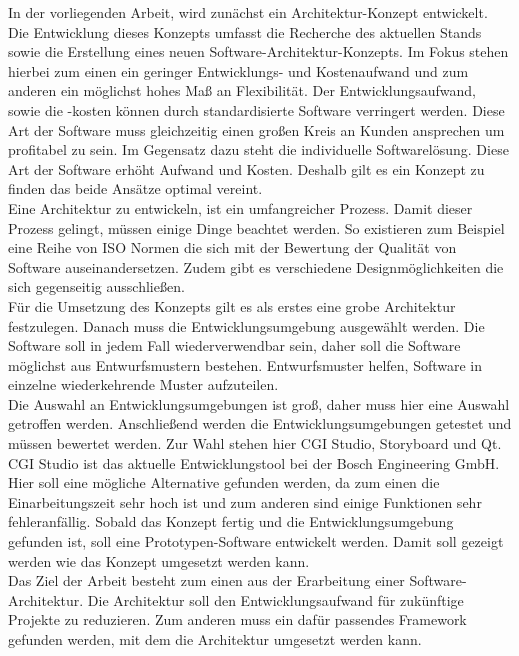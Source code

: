 In der vorliegenden Arbeit, wird zunächst ein Architektur-Konzept entwickelt. Die Entwicklung dieses Konzepts umfasst die Recherche des aktuellen Stands sowie die Erstellung eines neuen Software-Architektur-Konzepts. Im Fokus stehen hierbei zum einen ein geringer Entwicklungs- und Kostenaufwand und zum anderen ein möglichst hohes Maß an Flexibilität. Der Entwicklungsaufwand, sowie die -kosten können durch standardisierte Software verringert werden. Diese Art der Software muss gleichzeitig einen großen Kreis an Kunden ansprechen um profitabel zu sein. Im Gegensatz dazu steht die individuelle Softwarelösung. Diese Art der Software erhöht Aufwand und Kosten. Deshalb gilt es ein Konzept zu finden das beide Ansätze optimal vereint.\\

Eine Architektur zu entwickeln, ist ein umfangreicher Prozess. Damit dieser Prozess gelingt, müssen einige Dinge beachtet werden. So existieren zum Beispiel eine Reihe von ISO Normen die sich mit der Bewertung der Qualität von Software auseinandersetzen. Zudem gibt es verschiedene Designmöglichkeiten die sich gegenseitig ausschließen.\\

Für die Umsetzung des Konzepts gilt es als erstes eine grobe Architektur festzulegen. Danach muss die Entwicklungsumgebung ausgewählt werden. Die Software soll in jedem Fall wiederverwendbar sein, daher soll die Software möglichst aus Entwurfsmustern bestehen. Entwurfsmuster helfen, Software in einzelne wiederkehrende Muster aufzuteilen.\\

Die Auswahl an Entwicklungsumgebungen ist groß, daher muss hier eine Auswahl getroffen werden. Anschließend werden die Entwicklungsumgebungen getestet und müssen bewertet werden. Zur Wahl stehen hier CGI Studio, Storyboard und Qt. CGI Studio ist das aktuelle Entwicklungstool bei der Bosch Engineering GmbH. Hier soll eine mögliche Alternative gefunden werden, da zum einen die Einarbeitungszeit sehr hoch ist und zum anderen sind einige Funktionen sehr fehleranfällig. Sobald das Konzept fertig und die Entwicklungsumgebung gefunden ist, soll eine Prototypen-Software entwickelt werden. Damit soll gezeigt werden wie das Konzept umgesetzt werden kann.\\

Das Ziel der Arbeit besteht zum einen aus der Erarbeitung einer Software-Architektur. Die Architektur soll den Entwicklungsaufwand für zukünftige Projekte zu reduzieren. Zum anderen muss ein dafür passendes Framework gefunden werden, mit dem die Architektur umgesetzt werden kann.\\

